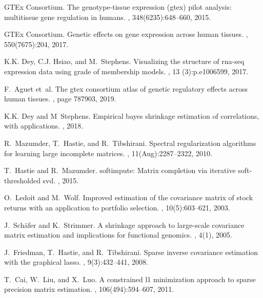 \documentclass{bioinfo}
\begin{document}



\begin{thebibliography}{}

GTEx Consortium.
\newblock The genotype-tissue expression (gtex) pilot analysis: multitissue gene regulation in humans.
, 348(6235):648--660, 2015.

GTEx Consortium.
\newblock Genetic effects on gene expression across human tissues.
, 550(7675):204, 2017.

K.K. Dey, C.J. Hsiao, and M.~Stephens.
\newblock Visualizing the structure of rna-seq expression data using grade of
  membership models.
, 13 (3):p.e1006599, 2017.

F.~Aguet et~al.
\newblock The gtex consortium atlas of genetic regulatory effects across human
  tissues.
, page 787903, 2019.

K.K. Dey and M~Stephens.
\newblock Empirical bayes shrinkage estimation of correlations, with
  applications.
, 2018.

R.~Mazumder, T.~Hastie, and R.~Tibshirani.
\newblock Spectral regularization algorithms for learning large incomplete
  matrices.
, 11(Aug):2287--2322, 2010.

T.~Hastie and R.~Mazumder.
\newblock softimpute: Matrix completion via iterative soft-thresholded svd.
, 2015.

O.~Ledoit and M.~Wolf.
\newblock Improved estimation of the covariance matrix of stock returns with an
  application to portfolio selection.
, 10(5):603--621, 2003.

J.~Sch{\"a}fer and K.~Strimmer.
\newblock A shrinkage approach to large-scale covariance matrix estimation and
  implications for functional genomics.
,
  4(1), 2005.

J.~Friedman, T.~Hastie, and R.~Tibshirani.
\newblock Sparse inverse covariance estimation with the graphical lasso.
, 9(3):432--441, 2008.

T.~Cai, W.~Liu, and X.~Luo.
\newblock A constrained l1 minimization approach to sparse precision matrix
  estimation.
,
  106(494):594--607, 2011.


\end{thebibliography}
\end{document}
